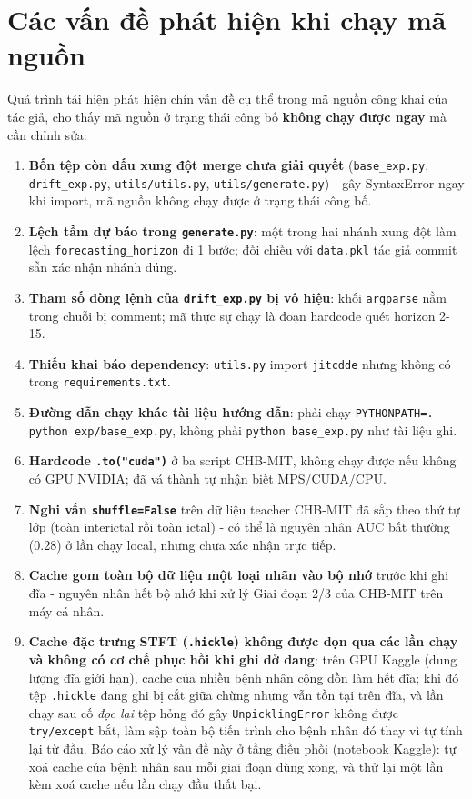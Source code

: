 \section{Các vấn đề phát hiện khi chạy mã nguồn}
\label{sec:cacvandephathien}

Quá trình tái hiện phát hiện chín vấn đề cụ thể trong mã nguồn công khai của tác giả, cho thấy
mã nguồn ở trạng thái công bố \textbf{không chạy được ngay} mà cần chỉnh sửa:

\begin{enumerate}
	\item \textbf{Bốn tệp còn dấu xung đột merge chưa giải quyết} (\texttt{base\_exp.py},
	\texttt{drift\_exp.py}, \texttt{utils/utils.py}, \texttt{utils/generate.py}) - gây
	SyntaxError ngay khi import, mã nguồn không chạy được ở trạng thái công bố.
	\item \textbf{Lệch tầm dự báo trong \texttt{generate.py}}: một trong hai nhánh xung đột làm
	lệch \texttt{forecasting\_horizon} đi 1 bước; đối chiếu với \texttt{data.pkl} tác giả commit
	sẵn xác nhận nhánh đúng.
	\item \textbf{Tham số dòng lệnh của \texttt{drift\_exp.py} bị vô hiệu}: khối
	\texttt{argparse} nằm trong chuỗi bị comment; mã thực sự chạy là đoạn hardcode quét horizon
	2-15.
	\item \textbf{Thiếu khai báo dependency}: \texttt{utils.py} import \texttt{jitcdde} nhưng
	không có trong \texttt{requirements.txt}.
	\item \textbf{Đường dẫn chạy khác tài liệu hướng dẫn}: phải chạy
	\texttt{PYTHONPATH=. python exp/base\_exp.py}, không phải \texttt{python base\_exp.py} như
	tài liệu ghi.
	\item \textbf{Hardcode \texttt{.to("cuda")}} ở ba script CHB-MIT, không chạy được nếu không
	có GPU NVIDIA; đã vá thành tự nhận biết MPS/CUDA/CPU.
	\item \textbf{Nghi vấn \texttt{shuffle=False}} \label{item:shuffle-false} trên dữ liệu
	teacher CHB-MIT đã sắp theo thứ tự lớp (toàn interictal rồi toàn ictal) - có thể là
	nguyên nhân AUC bất thường (0.28) ở lần chạy local, nhưng chưa xác nhận trực tiếp.
	\item \textbf{Cache gom toàn bộ dữ liệu một loại nhãn vào bộ nhớ} trước khi ghi đĩa -
	nguyên nhân hết bộ nhớ khi xử lý Giai đoạn 2/3 của CHB-MIT trên máy cá nhân.
	\item \textbf{Cache đặc trưng STFT (\texttt{.hickle}) không được dọn qua các lần chạy và
	không có cơ chế phục hồi khi ghi dở dang}: trên GPU Kaggle (dung lượng đĩa giới hạn), cache
	của nhiều bệnh nhân cộng dồn làm hết đĩa; khi đó tệp \texttt{.hickle} đang ghi bị cắt giữa
	chừng nhưng vẫn tồn tại trên đĩa, và lần chạy sau cố \textit{đọc lại} tệp hỏng đó gây
	\texttt{UnpicklingError} không được \texttt{try/except} bắt, làm sập toàn bộ tiến trình cho
	bệnh nhân đó thay vì tự tính lại từ đầu. Báo cáo xử lý vấn đề này ở tầng điều phối (notebook
	Kaggle): tự xoá cache của bệnh nhân sau mỗi giai đoạn dùng xong, và thử lại một lần kèm xoá
	cache nếu lần chạy đầu thất bại.
\end{enumerate}

